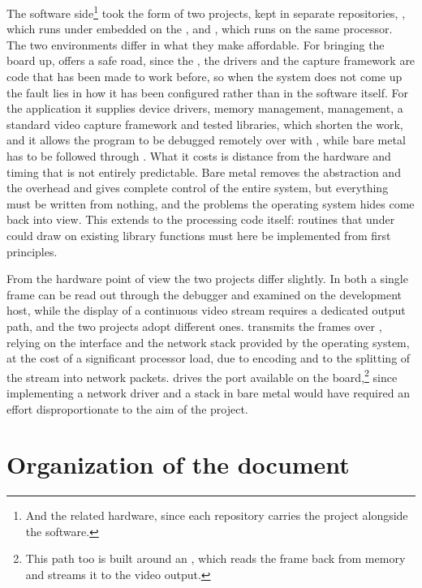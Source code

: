 The software side\footnote{And the related hardware, since each repository carries the  project alongside the software.} took the form of two projects, kept in separate repositories, \cite{FPGALIX-REPO}, which runs under embedded  on the , and \cite{FPGASTEEL-REPO}, which runs  on the same processor. The two environments differ in what they make affordable. For bringing the board up,  offers a safe road, since the , the drivers and the capture framework are code that has been made to work before, so when the system does not come up the fault lies in how it has been configured rather than in the software itself. For the application it supplies device drivers, memory management,  management, a standard video capture framework and tested libraries, which shorten the work, and it allows the program to be debugged remotely over  with , while bare metal has to be followed through  . What it costs is distance from the hardware and timing that is not entirely predictable. Bare metal removes the abstraction and the overhead and gives complete control of the entire system, but everything must be written from nothing, and the problems the operating system hides come back into view. This extends to the processing code itself: routines that under  could draw on existing library functions must here be implemented from first principles.

From the hardware point of view the two projects differ slightly. In both a single frame can be read out through the debugger and examined on the development host, while the display of a continuous video stream requires a dedicated output path, and the two projects adopt different ones.  transmits the frames over , relying on the interface and the network stack provided by the operating system, at the cost of a significant processor load, due to encoding and to the splitting of the stream into network packets.  drives the  port available on the board,\footnote{This path too is built around an , which reads the frame back from memory and streams it to the video output.} since implementing a network driver and a  stack in bare metal would have required an effort disproportionate to the aim of the project.

\section{Organization of the document}

